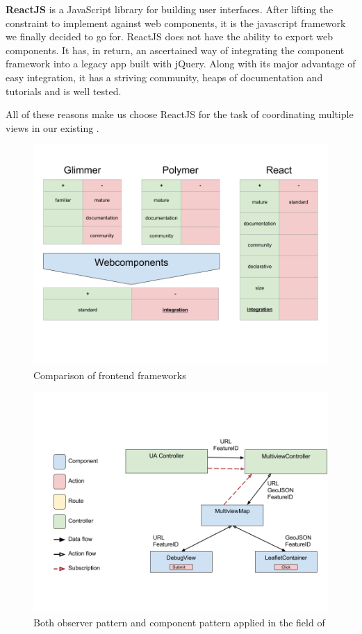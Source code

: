 \textbf{ReactJS} is a JavaScript library for building user interfaces\cite{React2017}.
After lifting the constraint to implement against web components, it is the javascript framework we finally decided to go for.
ReactJS does not have the ability to export web components.
It has, in return, an ascertained way of integrating the component framework into a legacy app built with jQuery.
Along with its major advantage of easy integration, it has a striving community, heaps of documentation and tutorials and is well tested.

All of these reasons make us choose ReactJS for the task of coordinating multiple views in our existing \visan{}.




\begin{figure}[h!]
  \centering
  \includegraphics[width=\textwidth]{images/frontend-frameworks.png}
  \caption{Comparison of frontend frameworks}\label{fig:implementation:frontend-frameworks}
\end{figure}


\begin{figure}[h!]
  \centering
  \includegraphics[width=\textwidth]{images/both-patterns-implemented.png}
  \caption{%
    Both observer pattern and component pattern applied in the field of \cmvs{}
  }\label{fig:implementation:both-patterns}
\end{figure}


